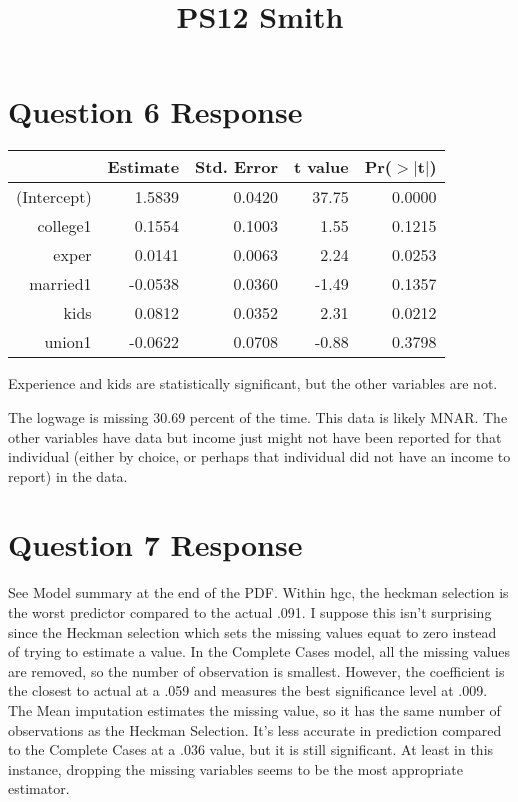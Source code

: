 \documentclass{article}
\title{PS12 Smith}
\begin{document}
\maketitle

\section{Question 6 Response}
\begin{table}[ht]
\centering
\begin{tabular}{rrrrr}
  \hline
 & Estimate & Std. Error & t value & Pr($>$$|$t$|$) \\ 
  \hline
(Intercept) & 1.5839 & 0.0420 & 37.75 & 0.0000 \\ 
  college1 & 0.1554 & 0.1003 & 1.55 & 0.1215 \\ 
  exper & 0.0141 & 0.0063 & 2.24 & 0.0253 \\ 
  married1 & -0.0538 & 0.0360 & -1.49 & 0.1357 \\ 
  kids & 0.0812 & 0.0352 & 2.31 & 0.0212 \\ 
  union1 & -0.0622 & 0.0708 & -0.88 & 0.3798 \\ 
   \hline
\end{tabular}
\end{table}
Experience and kids are statistically significant, but the other variables are not.

The logwage is missing 30.69 percent of the time. This data is likely MNAR. The other variables have data but income just might not have been reported for that individual (either by choice, or perhaps that individual did not have an income to report) in the data.

\section{Question 7 Response}
See Model summary at the end of the PDF.
Within hgc, the heckman selection is the worst predictor compared to the actual .091. I suppose this isn't surprising since the Heckman selection which sets the missing values equat to zero instead of trying to estimate a value. In the Complete Cases model, all the missing values are removed, so the number of observation is smallest. However, the coefficient is the closest to actual at a .059 and measures the best significance level at .009. The Mean imputation estimates the missing value, so it has the same number of observations as the Heckman Selection. It's less accurate in prediction compared to the Complete Cases at a .036 value, but it is still significant. At least in this instance, dropping the missing variables seems to be the most appropriate estimator.
\end{document}
